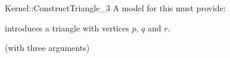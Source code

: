 \begin{ccRefFunctionObjectConcept}{Kernel::ConstructTriangle_3}
A model for this must provide:


            {introduces a triangle  with vertices $p$, $q$ and $r$.}

\ccRefines
{} (with three arguments)

\ccSeeAlso
{}\\

\end{ccRefFunctionObjectConcept}
